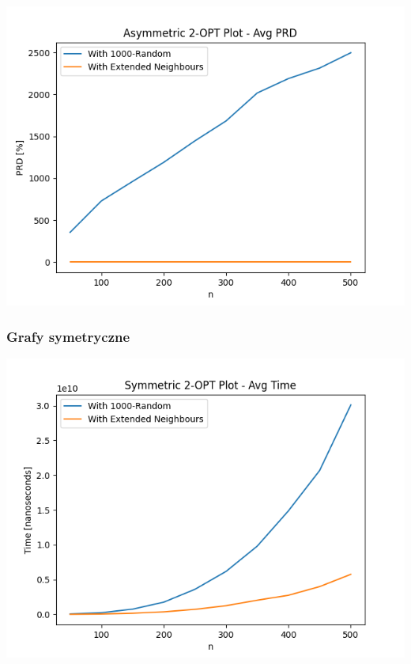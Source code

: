 \documentclass{article}
\begin{document}
\begin{center}
\includegraphics[width=\textwidth, 
                   height = 0.4\textheight, 
                   keepaspectratio]
                  {two_opt_asym_avg_prd} 
\end{center}

\subsubsection{Grafy symetryczne}

\begin{center}
\includegraphics[width=\textwidth, 
                   height = 0.4\textheight, 
                   keepaspectratio]
                  {two_opt_sym_avg_time} 
\end{center}
\end{document}
